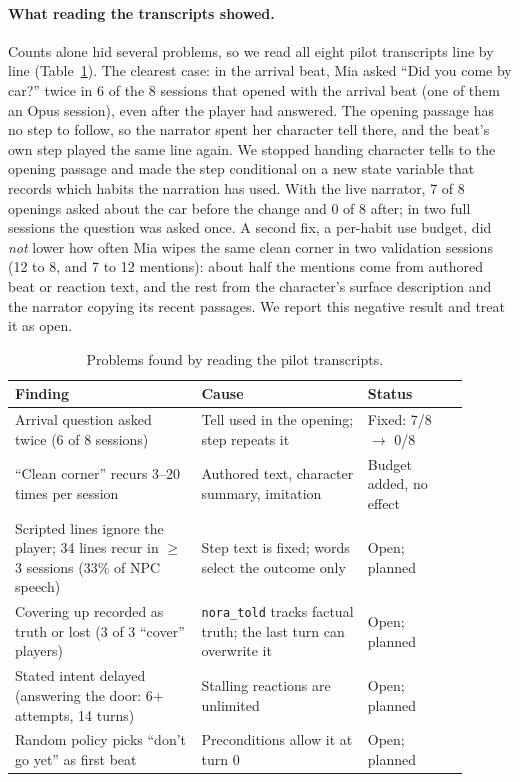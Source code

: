\documentclass{article}
\begin{document}
\paragraph{What reading the transcripts showed.}
Counts alone hid several problems, so we read all eight pilot transcripts line by line (Table~\ref{tab:issues}). The clearest case: in the arrival beat, Mia asked ``Did you come by car?'' twice in 6 of the 8 sessions that opened with the arrival beat (one of them an Opus session), even after the player had answered. The opening passage has no step to follow, so the narrator spent her character tell there, and the beat's own step played the same line again. We stopped handing character tells to the opening passage and made the step conditional on a new state variable that records which habits the narration has used. With the live narrator, 7 of 8 openings asked about the car before the change and 0 of 8 after; in two full sessions the question was asked once. A second fix, a per-habit use budget, did \emph{not} lower how often Mia wipes the same clean corner in two validation sessions (12 to 8, and 7 to 12 mentions): about half the mentions come from authored beat or reaction text, and the rest from the character's surface description and the narrator copying its recent passages. We report this negative result and treat it as open.

\begin{table}[t]
\centering\small
\caption{Problems found by reading the pilot transcripts.}
\label{tab:issues}
\begin{tabular}{p{0.37\linewidth}p{0.33\linewidth}p{0.20\linewidth}}
\toprule
Finding & Cause & Status \\
\midrule
Arrival question asked twice (6 of 8 sessions) & Tell used in the opening; step repeats it & Fixed: 7/8 $\to$ 0/8 \\
``Clean corner'' recurs 3--20 times per session & Authored text, character summary, imitation & Budget added, no effect \\
Scripted lines ignore the player; 34 lines recur in $\ge$3 sessions (33\% of NPC speech) & Step text is fixed; words select the outcome only & Open; planned \\
Covering up recorded as truth or lost (3 of 3 ``cover'' players) & \texttt{nora\_told} tracks factual truth; the last turn can overwrite it & Open; planned \\
Stated intent delayed (answering the door: 6+ attempts, 14 turns) & Stalling reactions are unlimited & Open; planned \\
Random policy picks ``don't go yet'' as first beat & Preconditions allow it at turn 0 & Open; planned \\
\bottomrule
\end{tabular}
\end{table}
\end{document}
